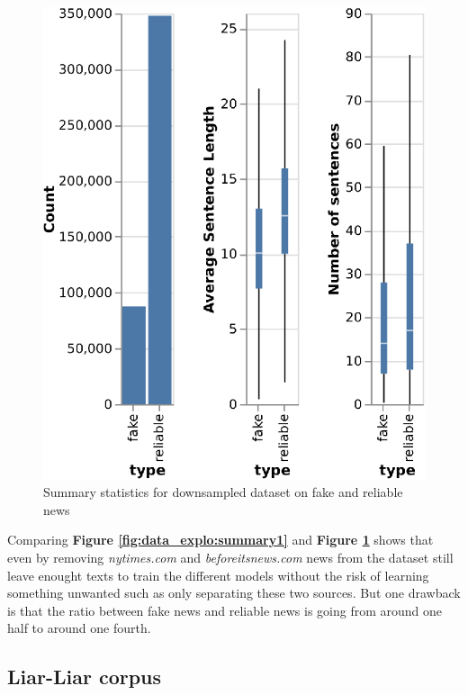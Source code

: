 \begin{figure}[h]
	\centering
	\includegraphics{images/data_exploration/downsampled.eps}
	\caption{Summary statistics for downsampled dataset on fake and reliable news}
	\label{fig:data_explo:summary2}
\end{figure}

Comparing \textbf{Figure \ref{fig:data_explo:summary1}} and \textbf{Figure \ref{fig:data_explo:summary2}} shows that even by removing \textit{nytimes.com} and \textit{beforeitsnews.com} news from the dataset still leave enought texts to train the different models without the risk of learning something unwanted such as only separating these two sources. But one drawback is that the ratio between fake news and reliable news is going from around one half to around one fourth. 


\subsection{Liar-Liar corpus}
